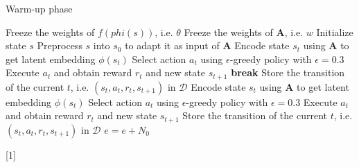 \documentclass[a4paper,12pt,oneside]{article}
\numberwithin{equation}{section}
\begin{document}
    \clearpage
    \begin{algorithm}
    \caption{Warm-up phase}
        \begin{algorithmic}[1]
            \State Freeze the weights of \(f(phi(s))\), i.e. $\theta$
            \State Freeze the weights of $\mathbf{A}$, i.e. \(w\)
            \State Initialize state \(s\) 
            \State Preprocess \(s\) into \(s_0\) to adapt it as input of $\mathbf{A}$
                \State Encode state \(s_t\) using $\mathbf{A}$ to get latent embedding $\phi(s_t)$
                \State Select action $a_t$ using $\epsilon$-greedy policy with $\epsilon=0.3$
                \State Execute $a_t$ and obtain reward $r_t$ and new state $s_{t+1}$
                    \State \textbf{break}
                \EndIf
                \State Store the transition of the current \(t\), i.e. $(s_t, a_t, r_t, s_{t+1})$ in $\mathcal{D}$
                \State Encode state \(s_t\) using $\mathbf{A}$ to get latent embedding $\phi(s_t)$
                \State Select action $a_t$ using $\epsilon$-greedy policy with $\epsilon=0.3$
                \State Execute $a_t$ and obtain reward $r_t$ and new state $s_{t+1}$
                \State Store the transition of the current \(t\), i.e. $(s_t, a_t, r_t, s_{t+1})$ in $\mathcal{D}$
            \EndFor
        \EndFor
        \State $e=e+N_0$
        \end{algorithmic}[1]
    \end{algorithm}
    
\end{document}

